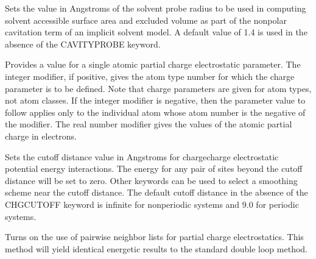 \documentclass[letterpaper,11pt,english]{sphinxmanual}
\begin{document}
\ignorespaces {}\label{\detokenize{text/keywords:key-cavity-probe}}\begin{description}
\sphinxAtStartPar
Sets the value in Angstroms of the solvent probe radius to be used in computing solvent accessible surface area and excluded volume as part of the nonpolar cavitation term of an implicit solvent model. A default value of 1.4 is used in the absence of the CAVITY\sphinxhyphen{}PROBE keyword.

\end{description}

\ignorespaces {}\label{\detokenize{text/keywords:key-charge}}\begin{description}
\sphinxAtStartPar
Provides a value for a single atomic partial charge electrostatic parameter. The integer modifier, if positive, gives the atom type number for which the charge parameter is to be defined. Note that charge parameters are given for atom types, not atom classes. If the integer modifier is negative, then the parameter value to follow applies only to the individual atom whose atom number is the negative of the modifier. The real number modifier gives the values of the atomic partial charge in electrons.

\end{description}

\ignorespaces {}\label{\detokenize{text/keywords:key-charge-cutoff}}\begin{description}
\sphinxAtStartPar
Sets the cutoff distance value in Angstroms for charge\sphinxhyphen{}charge electrostatic potential energy interactions. The energy for any pair of sites beyond the cutoff distance will be set to zero. Other keywords can be used to select a smoothing scheme near the cutoff distance. The default cutoff distance in the absence of the CHG\sphinxhyphen{}CUTOFF keyword is infinite for nonperiodic systems and 9.0 for periodic systems.

\end{description}

\ignorespaces {}\label{\detokenize{text/keywords:key-charge-list}}\begin{description}
\sphinxAtStartPar
Turns on the use of pairwise neighbor lists for partial charge electrostatics. This method will yield identical energetic results to the standard double loop method.

\end{description}
\end{document}
